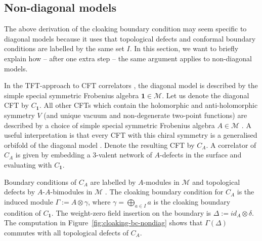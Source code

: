 \documentclass[11pt,a4paper]{article}
\numberwithin{equation}{section}
\newcommand{\one}{\mathbf{1}} %
\newcommand{\MC}{\mathcal{M}} %
\begin{document}
\subsection{Non-diagonal models}\label{sec:non-diag-cloak}

The above derivation of the cloaking boundary condition may seem specific to diagonal models because it uses that topological defects and conformal boundary conditions are labelled by the same set $I$. In this section, we want to briefly explain how -- after one extra step -- the same argument applies to non-diagonal models.

In the TFT-approach to CFT correlators \cite{Fuchs:2002cm}, the diagonal model is described by the simple special symmetric Frobenius algebra $\one \in \MC$. Let us denote the diagonal CFT by $C_\one$. All other CFTs which contain the holomorphic and anti-holomorphic symmetry $V$ (and unique vacuum and non-degenerate two-point functions) are described by a choice of simple special symmetric Frobenius algebra $A \in \MC$ \cite{Fjelstad:2006aw,Kong:2009inh}. A useful interpretation is that every CFT with this chiral symmetry is a generalised orbifold of the diagonal model \cite{Frohlich:2009gb}. Denote the resulting CFT by $C_A$. A correlator of $C_A$ is given by embedding a 3-valent network of $A$-defects in the surface and evaluating with $C_\one$. 

Boundary conditions of $C_A$ are labelled by $A$-modules in $\MC$ and topological defects by $A$-$A$-bimodules in $\MC$ \cite{Frohlich:2006ch}. 
The cloaking boundary condition for $C_A$ is the induced module $\Gamma := A \otimes \gamma$, where $\gamma = \bigoplus_{a \in I} a$ is the cloaking boundary condition of $C_\one$. The weight-zero field insertion on the boundary is $\Delta := id_A \otimes \delta$. The computation in Figure~\ref{fig:cloaking-bc-nondiag} shows that $\Gamma(\Delta)$ commutes with all topological defects of $C_A$.
\end{document}
